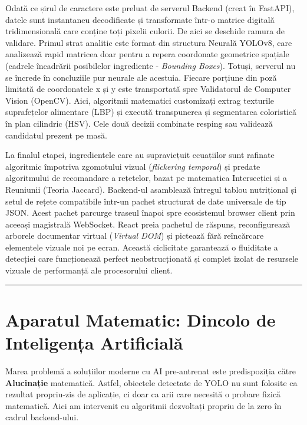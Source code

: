 \documentclass[12pt,a4paper]{article}
\begin{document}
Odată ce șirul de caractere este preluat de serverul Backend (creat în FastAPI), datele sunt instantaneu decodificate și transformate într-o matrice digitală tridimensională care conține toți pixelii culorii. De aici se deschide ramura de validare. Primul strat analitic este format din structura Neurală YOLOv8, care analizează rapid matricea doar pentru a repera coordonate geometrice spațiale (cadrele încadrării posibilelor ingrediente - \textit{Bounding Boxes}). Totuși, serverul nu se încrede în concluziile pur neurale ale acestuia. Fiecare porțiune din poză limitată de coordonatele x și y este transportată spre Validatorul de Computer Vision (OpenCV). Aici, algoritmii matematici customizați extrag texturile suprafețelor alimentare (LBP) și execută transpunerea și segmentarea coloristică în plan cilindric (HSV). Cele două decizii combinate resping sau validează candidatul prezent pe masă.

La finalul etapei, ingredientele care au supraviețuit ecuațiilor sunt rafinate algoritmic împotriva zgomotului vizual (\textit{flickering temporal}) și predate algoritmului de recomandare a rețetelor, bazat pe matematica Intersecției și a Reuniunii (Teoria Jaccard). Backend-ul asamblează întregul tablou nutrițional și setul de rețete compatibile într-un pachet structurat de date universale de tip JSON. Acest pachet parcurge traseul înapoi spre ecosistemul browser client prin aceeași magistrală WebSocket. React preia pachetul de răspuns, reconfigurează arborele documentar virtual (\textit{Virtual DOM}) și pictează fără reîncărcare elementele vizuale noi pe ecran. Această ciclicitate garantează o fluiditate a detecției care funcționează perfect neobstrucționată și complet izolat de resursele vizuale de performanță ale procesorului client.

\vspace{0.5cm}
\hrule
\vspace{0.5cm}

\section{Aparatul Matematic: Dincolo de Inteligența Artificială}

Marea problemă a soluțiilor moderne cu AI pre-antrenat este predispoziția către \textbf{Alucinație} matematică. Astfel, obiectele detectate de YOLO nu sunt folosite ca rezultat propriu-zis de aplicație, ci doar ca arii care necesită o probare fizică matematică. Aici am intervenit cu algoritmii dezvoltați propriu de la zero în cadrul backend-ului.
\end{document}
